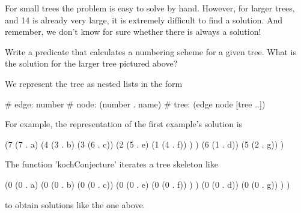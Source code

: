 

For small trees the problem is easy to solve by hand. However, for
larger trees, and 14 is already very large, it is extremely difficult
to find a solution. And remember, we don't know for sure whether there
is always a solution!

Write a predicate that calculates a numbering scheme for a given tree.
What is the solution for the larger tree pictured above?

\begin{wideverbatim}

We represent the tree as nested lists in the form

# edge:  number
# node:  (number . name)
# tree:  (edge node [tree ..])

For example, the representation of the first example's solution is

   (7 (7 . a)
      (4 (3 . b)
         (3 (6 . c))
         (2 (5 . e)
            (1 (4 . f)) ) )
      (6 (1 . d))
      (5 (2 . g)) )

The function 'kochConjecture' iterates a tree skeleton like

(0 (0 . a)
   (0 (0 . b)
      (0 (0 . c))
      (0 (0 . e)
         (0 (0 . f)) ) )
   (0 (0 . d))
   (0 (0 . g)) ) )

to obtain solutions like the one above.

\end{wideverbatim}

